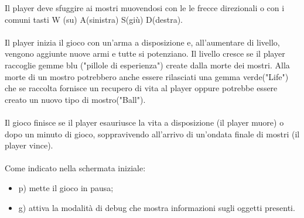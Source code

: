 \documentclass[a4paper,12pt]{report}
\begin{document}
Il player deve sfuggire ai mostri muovendosi con le le frecce direzionali o con i comuni tasti W (su) A(sinistra) S(giù) D(destra).
\paragraph{}
Il player inizia il gioco con un'arma a disposizione e, all'aumentare di livello, vengono aggiunte nuove armi e tutte si potenziano.
%
Il livello cresce se il player raccoglie gemme blu ("pillole di esperienza") create dalla morte dei mostri.
Alla morte di un mostro potrebbero anche essere rilasciati una gemma verde("Life") che se raccolta fornisce un recupero di vita al player oppure potrebbe essere creato un nuovo tipo di mostro("Ball").
\paragraph{}
Il gioco finisce se il player esauriusce la vita a disposizione (il player muore) o dopo un minuto di gioco, soppravivendo all'arrivo di un'ondata finale di mostri (il player vince).
\paragraph{}
Come indicato nella schermata iniziale:
\begin{itemize}
\item p) mette il gioco in pausa;
\item g) attiva la modalità di debug che mostra informazioni sugli oggetti presenti.
\end{itemize}


% 
% 
\end{document}
